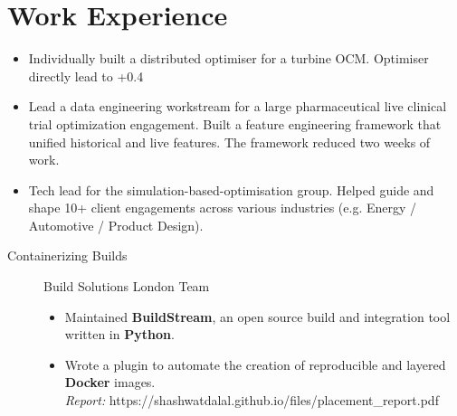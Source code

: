 \documentclass[a4paper]{deedy-resume} %
\begin{document}
\section{Work Experience}
\begin{itemize}
    \item Individually built a distributed optimiser for a turbine OCM. Optimiser directly lead to +0.4%
    \item Lead a data engineering workstream for a large pharmaceutical live clinical trial optimization engagement. Built a feature engineering framework that unified historical and live features. The framework reduced two weeks of work.
    \item Tech lead for the simulation-based-optimisation group. Helped guide and shape 10+ client engagements across various industries (e.g. Energy / Automotive / Product Design). 
\end{itemize} 
\begin{description}
    \item[Containerizing Builds] Build Solutions London Team
        \begin{itemize}
            \item Maintained \textbf{BuildStream}, an open source build and integration tool written in \textbf{Python}.
            \item Wrote a plugin to automate the creation of reproducible and layered \textbf{Docker} images.
            \\
            \textit{Report:} https://shashwatdalal.github.io/files/placement\_report.pdf \\
        \end{itemize}
\end{description}
\end{document}
